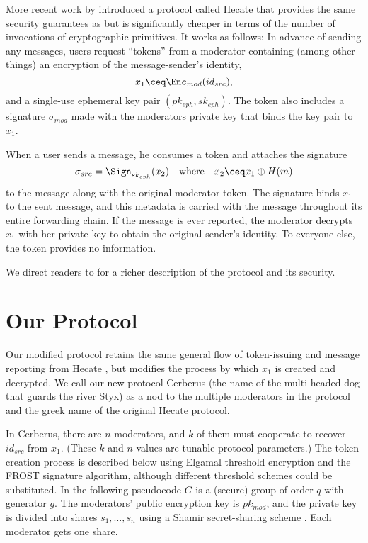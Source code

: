 \documentclass[conference]{IEEEtran}
\begin{document}
More recent work by \textcite{hecate} introduced a protocol called Hecate that provides the same security guarantees as \textcite{tglmr} but is significantly cheaper in terms of the number of invocations of cryptographic primitives.
It works as follows:
In advance of sending any messages, users request ``tokens'' from a moderator containing (among other things) an encryption of the message-sender's identity,
\begin{equation}
	x_1 \ceq \Enc_{mod}(id_{src}),
\end{equation}
and a single-use ephemeral key pair $(pk_{eph}, sk_{eph})$.
The token also includes a signature $\sigma_{mod}$ made with the moderators private key that binds the key pair to $x_1$.

When a user sends a message, he consumes a token and attaches the signature
\begin{equation}
	\sigma_{src} = \Sign_{sk_{eph}}(x_2)
	\quad \text{where} \quad
	x_2 \ceq x_1 \oplus H(m)
\end{equation}
to the message along with the original moderator token.
The signature binds $x_1$ to the sent message, and this metadata is carried with the message throughout its entire forwarding chain.
If the message is ever reported, the moderator decrypts $x_1$ with her private key to obtain the original sender's identity.
To everyone else, the token provides no information.

We direct readers to \textcite{hecate} for a richer description of the protocol and its security.

\section{Our Protocol}

Our modified protocol retains the same general flow of token-issuing and message reporting from Hecate \cite{hecate}, but modifies the process by which $x_1$ is created and decrypted.
We call our new protocol Cerberus (the name of the multi-headed dog that guards the river Styx) as a nod to the multiple moderators in the protocol and the greek name of the original Hecate protocol.

In Cerberus, there are $n$ moderators, and $k$ of them must cooperate to recover $id_{src}$ from $x_1$.
(These $k$ and $n$ values are tunable protocol parameters.)
The token-creation process is described below using Elgamal threshold encryption and the FROST \cite{frost} signature algorithm, although different threshold schemes could be substituted. In the following pseudocode $G$ is a (secure) group of order $q$ with generator $g$.
The moderators' public encryption key is $pk_{mod}$, and the private key is divided into shares $s_1, \ldots, s_n$ using a Shamir secret-sharing scheme \cite{shamir-secret-sharing}. Each moderator gets one share.
\end{document}
